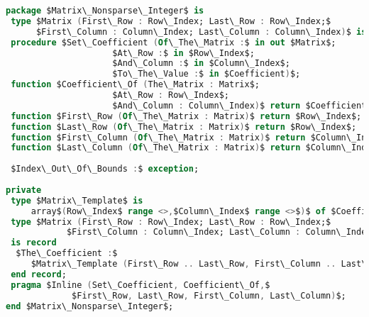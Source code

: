 \documentclass{./git_rep/mai_prac_2017/template/mai_book}
\begin{document}
\begin{lstlisting}[mathescape=true, language=Ada]
package $Matrix\_Nonsparse\_Integer$ is
 type $Matrix (First\_Row : Row\_Index; Last\_Row : Row\_Index;$
      $First\_Column : Column\_Index; Last\_Column : Column\_Index)$ is private;
 procedure $Set\_Coefficient (Of\_The\_Matrix :$ in out $Matrix$;
                     $At\_Row :$ in $Row\_Index$;
                     $And\_Column :$ in $Column\_Index$;
                     $To\_The\_Value :$ in $Coefficient)$;
 function $Coefficient\_Of (The\_Matrix : Matrix$;
                     $At\_Row : Row\_Index$;
                     $And\_Column : Column\_Index)$ return $Coefficient$;            
 function $First\_Row (Of\_The\_Matrix : Matrix)$ return $Row\_Index$;
 function $Last\_Row (Of\_The\_Matrix : Matrix)$ return $Row\_Index$;
 function $First\_Column (Of\_The\_Matrix : Matrix)$ return $Column\_Index$;
 function $Last\_Column (Of\_The\_Matrix : Matrix)$ return $Column\_Index$;
 
 $Index\_Out\_Of\_Bounds :$ exception;
 
private
 type $Matrix\_Template$ is
     array$(Row\_Index$ range <>,$Column\_Index$ range <>$)$ of $Coefficient$;
 type $Matrix (First\_Row : Row\_Index; Last\_Row : Row\_Index;$
            $First\_Column : Column\_Index; Last\_Column : Column\_Index)$
 is record
  $The\_Coefficient :$
     $Matrix\_Template (First\_Row .. Last\_Row, First\_Column .. Last\_Column)$;
 end record;
 pragma $Inline (Set\_Coefficient, Coefficient\_Of,$
             $First\_Row, Last\_Row, First\_Column, Last\_Column)$;
end $Matrix\_Nonsparse\_Integer$;
\end{lstlisting}
\end{document}
